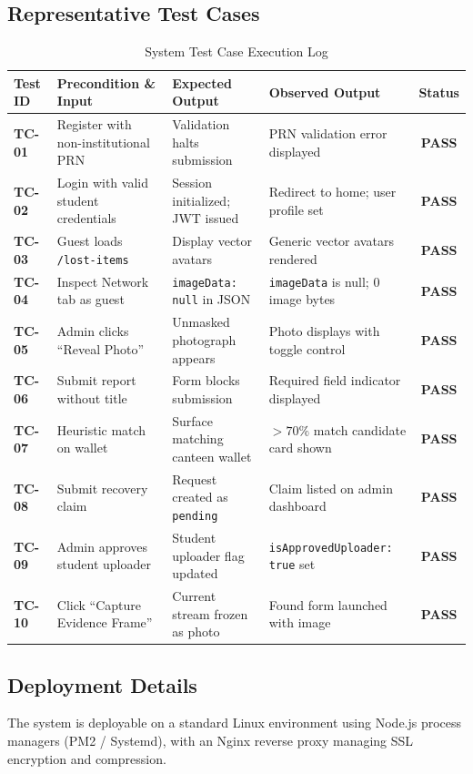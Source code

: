 \documentclass[11pt,a4paper]{article}
\begin{document}
\subsection{Representative Test Cases}

\begin{table}[H]
\centering
\small
\caption{System Test Case Execution Log}
\begin{tabularx}{\textwidth}{lp{4.2cm}p{4.2cm}p{3cm}c}
\toprule
\textbf{Test ID} & \textbf{Precondition \& Input} & \textbf{Expected Output} & \textbf{Observed Output} & \textbf{Status} \\
\midrule
\textbf{TC-01} & Register with non-institutional PRN & Validation halts submission & PRN validation error displayed & \textbf{PASS} \\
\textbf{TC-02} & Login with valid student credentials & Session initialized; JWT issued & Redirect to home; user profile set & \textbf{PASS} \\
\textbf{TC-03} & Guest loads \texttt{/lost-items} & Display vector avatars & Generic vector avatars rendered & \textbf{PASS} \\
\textbf{TC-04} & Inspect Network tab as guest & \texttt{imageData: null} in JSON & \texttt{imageData} is null; 0 image bytes & \textbf{PASS} \\
\textbf{TC-05} & Admin clicks ``Reveal Photo'' & Unmasked photograph appears & Photo displays with toggle control & \textbf{PASS} \\
\textbf{TC-06} & Submit report without title & Form blocks submission & Required field indicator displayed & \textbf{PASS} \\
\textbf{TC-07} & Heuristic match on wallet & Surface matching canteen wallet & $> 70\%$ match candidate card shown & \textbf{PASS} \\
\textbf{TC-08} & Submit recovery claim & Request created as \texttt{pending} & Claim listed on admin dashboard & \textbf{PASS} \\
\textbf{TC-09} & Admin approves student uploader & Student uploader flag updated & \texttt{isApprovedUploader: true} set & \textbf{PASS} \\
\textbf{TC-10} & Click ``Capture Evidence Frame'' & Current stream frozen as photo & Found form launched with image & \textbf{PASS} \\
\bottomrule
\end{tabularx}
\end{table}

\subsection{Deployment Details}
The system is deployable on a standard Linux environment using Node.js process managers (PM2 / Systemd), with an Nginx reverse proxy managing SSL encryption and compression.
\end{document}

